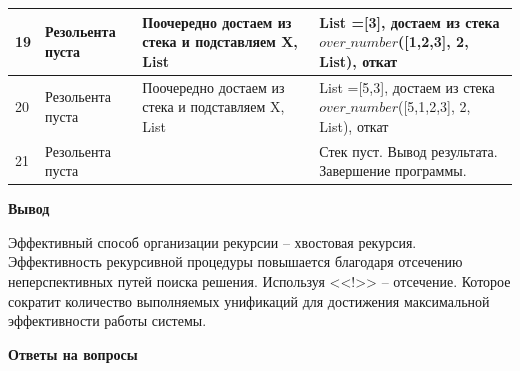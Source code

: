 \documentclass[a4paper,14pt]{extreport} %
\begin{document}
\begin{longtable}{|p{0.5cm}|p{5cm}|p{6cm}|p{5.5cm}|}
	19 & Резольента пуста & Поочередно достаем из стека и подставляем X, List & List =[3], достаем из стека $over\_number$([1,2,3], 2, List), откат \\ \hline
	
	20 & Резольента пуста & Поочередно достаем из стека и подставляем X, List & List =[5,3], достаем из стека $over\_number$([5,1,2,3], 2, List), откат \\ \hline
	
	21 & Резольента пуста &  & Стек пуст. Вывод результата. Завершение программы.  \\ \hline
\end{longtable}

\hfill

\textbf{Вывод}

Эффективный способ организации рекурсии --  хвостовая рекурсия. Эффективность рекурсивной процедуры повышается благодаря отсечению неперспективных путей поиска решения. Используя <<!>> -- отсечение. Которое сократит количество выполняемых унификаций для достижения максимальной эффективности работы системы. 

\hfill

\textbf{Ответы на вопросы}
\end{document}
